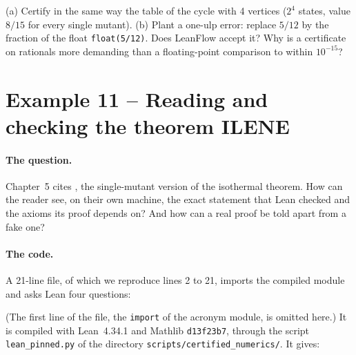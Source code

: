 \begin{exercise}\label{appF:exo10}
(a) Certify in the same way the table of the cycle with 4 vertices ($2^4$ states, value $8/15$ for every single
mutant). (b) Plant a one-ulp error: replace $5/12$ by the fraction of the float \texttt{float(5/12)}. Does LeanFlow
accept it? Why is a certificate on rationals more demanding than a floating-point comparison to within $10^{-15}$?
\end{exercise}

\section{Example 11 -- Reading and checking the theorem ILENE}\label{appF:ex11}

\paragraph{The question.} Chapter~5 cites , the single-mutant version of the isothermal theorem. How can the
reader see, on their own machine, the exact statement that Lean checked and the axioms its proof depends on? And how
can a real proof be told apart from a fake one?

\paragraph{The code.} A 21-line file, of which we reproduce lines 2 to 21, imports the compiled module and asks Lean four questions:

(The first line of the file, the \texttt{import} of the acronym module, is omitted here.)
It is compiled with Lean~4.34.1 and Mathlib \texttt{d13f23b7}, through the script \texttt{lean\_pinned.py} of the
directory \texttt{scripts/certified\_numerics/}. It gives:

